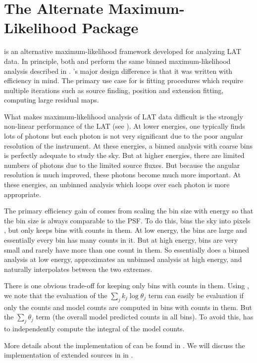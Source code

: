 \section{The Alternate Maximum-Likelihood Package \pointlike}

\pointlike is an alternative maximum-likelihood framework developed
for analyzing \ac{LAT} data. In principle, both \pointlike and \gtlike
perform the same binned maximum-likelihood analysis described in
. \pointlike's major design difference
is that it was written with efficiency in mind. The primary use case
for \pointlike is fitting procedures which require multiple iterations
such as source finding, position and extension fitting, computing large
residual \ts maps.

What makes maximum-likelihood analysis of \ac{LAT} data difficult
is the strongly non-linear performance of the \ac{LAT} (see
). At lower energies, one typically finds
lots of photons but each photon is not very significant due to the
poor angular resolution of the instrument. At these energies, a binned
analysis with coarse bins is perfectly adequate to study the sky.
But at higher energies, there are limited numbers of photons due to
the limited source fluxes. But because the angular resolution is much
improved, these photons become much more important. At these energies,
an unbinned analysis which loops over each photon is more appropriate.

The primary efficiency gain of \pointlike comes from scaling the bin
size with energy so that the bin size is always comparable to the
\ac{PSF}.  To do this, \pointlike bins the sky into \healpix pixels
\citep{gorski_2005_healpix:-framework}, but only keeps bins with counts
in them.  At low energy, the bins are large and essentially every 
bin has many counts in it.  But at high energy, bins are very small and rarely
have more than one count in them.  So \pointlike essentially does a binned
analysis at low energy, approximates an unbinned analysis at high energy,
and naturally interpolates between the two extremes.

There is one obvious trade-off for keeping only bins with counts in them.
Using , we note that the evaluation
of the $\sum_j k_j\log\theta_j$ term can easily be evaluation if only
the counts and model counts are computed in bins with counts in them.
But the $\sum_j \theta_j$ term (the overall model predicted counts in
all bins). To avoid this, \pointlike has to independently compute the
integral of the model counts.

More details about the implementation of \pointlike can be found in
\cite{kerr_2010a_likelihood-methods}. We will discuss the implementation
of extended sources in \pointlike in .
